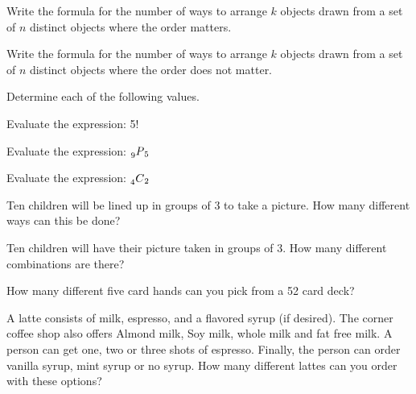 \begin{problem}

  \item Write the formula for the number of ways to arrange $k$
    objects drawn from a set of $n$ distinct objects where the order
    matters.

    \vfill

  \item Write the formula for the number of ways to arrange $k$
    objects drawn from a set of $n$ distinct objects where the order
    does not matter. 

    \vfill

  \item Determine each of the following values.

    \begin{subproblem}

    \item Evaluate the expression: 5!

      \vfill

    \item Evaluate the expression: $\prescript{~}{9}{P}_5$

      \vfill


    \clearpage

    \item Evaluate the expression: $\prescript{~}{4}{C}_2$

      \vfill

    \item Ten children will be lined up in groups of 3 to take a
      picture. How many different ways can this be done?

      \vfill

    \item Ten children will have their picture taken in groups of
      3. How many different combinations are there?

      \vfill


    \item How many different five card hands can you pick from a 52
      card deck?

      \vfill

    \item A latte consists of milk, espresso, and a flavored syrup (if
      desired). The corner coffee shop also offers Almond milk, Soy
      milk, whole milk and fat free milk. A person can get one, two or
      three shots of espresso. Finally, the person can order vanilla
      syrup, mint syrup or no syrup. How many different lattes can you
      order with these options?


\end{subproblem}
\end{problem}
